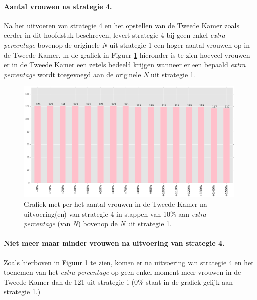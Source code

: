 \paragraph{Aantal vrouwen na strategie 4.}
Na het uitvoeren van strategie 4 en het opstellen van de Tweede Kamer zoals eerder in dit hoofdstuk beschreven, levert strategie 4 bij geen enkel \textit{extra percentage} bovenop de originele \textit{N} uit strategie 1 een hoger aantal vrouwen op in de Tweede Kamer. In de grafiek in Figuur \ref{fig:bcS4V} hieronder is te zien hoeveel vrouwen er in de Tweede Kamer een zetels bedeeld krijgen wanneer er een bepaald \textit{extra percentage} wordt toegevoegd aan de originele \textit{N} uit strategie 1.



\begin{figure}[H]

	\includegraphics[width=\linewidth]	{topNextrapercentage_aantal_vrouwen_overzicht.png}

			\caption{Grafiek met per het aantal vrouwen in de Tweede Kamer na uitvoering(en) van strategie 4 in stappen van 10\% aan \textit{extra percentage} (van \textit{N}) bovenop de \textit{N} uit strategie 1.}

\label{fig:bcS4V}
\end{figure}

\paragraph{Niet meer maar minder vrouwen na uitvoering van strategie 4.}
Zoals hierboven in Figuur \ref{fig:bcS4V} te zien, komen er na uitvoering van strategie 4 en het toenemen van het \textit{extra percentage} op geen enkel moment meer vrouwen in de Tweede Kamer dan de 121 uit strategie 1 (0\% staat in de grafiek gelijk aan strategie 1.) 


